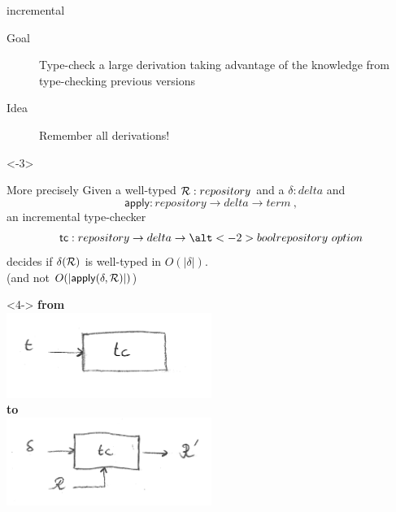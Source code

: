 \documentclass[ignorenonframetext,red]{beamer}
\begin{document}
\begin{frame}{ incremental
    }
    \begin{description}
    \item[Goal] Type-check a large derivation taking advantage of the
      knowledge from type-checking previous versions
    \item[Idea] Remember all derivations!
    \end{description}
    \pause \inXLF
    \begin{overlayarea}\textwidth{12em}
      \begin{onlyenv}<-3>
        \begin{block}{More precisely}
          Given a well-typed $\mathcal{R} : repository$ and a $\delta : delta$
          and $$\mathsf{apply} : repository \to delta \to term\ ,$$an
          incremental type-checker $$\mathsf{tc} : repository \to
          delta \to \alt<-2>{bool}{repository\ option} $$ decides if
          $\delta(\mathcal{R})$ is
          well-typed in $O(|\delta|)$. \\
          {\hfill\scriptsize (and not
            $O(|\mathsf{apply}(\delta,\mathcal{R})|)$)}
        \end{block}
      \end{onlyenv}
      \begin{onlyenv}<4->
        \textbf{from}\\
        {\includegraphics[width=0.5\textwidth]{images/tc-classic.png}} \\
        \textbf{to}\\
        {\includegraphics[width=0.5\textwidth]{images/tc-delta1.png}} \\
      \end{onlyenv}
    \end{overlayarea}
\end{frame}
\end{document}
